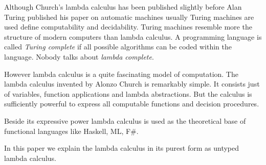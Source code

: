 Although Church's lambda calculus has been published slightly before Alan
Turing published his paper on automatic machines usually Turing machines are
used define computability and decidability. Turing machines resemble more the
structure of modern computers than lambda calculus. A programming language is
called \emph{Turing complete} if all possible algorithms can be coded within
the language. Nobody talks about \emph{lambda complete}.

However lambda calculus is a quite fascinating model of computation.  The
lambda calculus invented by Alonzo Church is remarkably simple. It consists
just of variables, function applications and lambda abstractions. But the
calculus is sufficiently powerful to express all computable functions and
decision procedures.

Beside its expressive power lambda calculus is used as the theoretical base of
functional languages like Haskell, ML, F\#.

In this paper we explain the lambda calculus in its purest form as untyped
lambda calculus.
